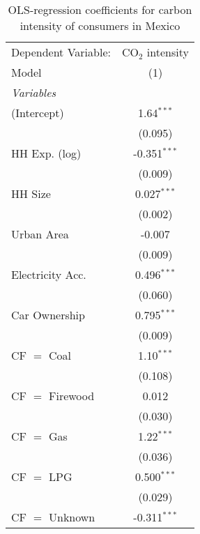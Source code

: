 
\begin{table}[htbp!]
   \centering
   \small
   \begin{adjustbox}{width = 1\textwidth, max height = 0.95\textheight, center}
      \begin{threeparttable}[b]
         \caption{\label{tab:OLS_1_MEX} OLS-regression coefficients for carbon intensity of consumers in Mexico}
         \begin{tabular}{lc}
            \tabularnewline \midrule \midrule
            Dependent Variable: & CO$_{2}$ intensity\\  
            Model               & (1)\\  
            \midrule
            \emph{Variables}\\
            (Intercept)         & 1.64$^{***}$\\   
                                & (0.095)\\   
            HH Exp. (log)       & -0.351$^{***}$\\   
                                & (0.009)\\   
            HH Size             & 0.027$^{***}$\\   
                                & (0.002)\\   
            Urban Area          & -0.007\\   
                                & (0.009)\\   
            Electricity Acc.    & 0.496$^{***}$\\   
                                & (0.060)\\   
            Car Ownership       & 0.795$^{***}$\\   
                                & (0.009)\\   
            CF $=$ Coal         & 1.10$^{***}$\\   
                                & (0.108)\\   
            CF $=$ Firewood     & 0.012\\   
                                & (0.030)\\   
            CF $=$ Gas          & 1.22$^{***}$\\   
                                & (0.036)\\   
            CF $=$ LPG          & 0.500$^{***}$\\   
                                & (0.029)\\   
            CF $=$ Unknown      & -0.311$^{***}$\\   

\end{tabular}
\end{threeparttable}
\end{adjustbox}
\end{table}
